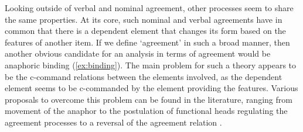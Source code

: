 \documentclass[output=paper
,modfonts
,nonflat]{langsci/langscibook}
\begin{document}
Looking outside of verbal and nominal agreement, other processes seem to share the same properties.
At its core, such nominal and verbal agreements have in common that there is a dependent element that changes its form based on the features of another item.
If we define `agreement' in such a broad manner, then another obvious candidate for an analysis in terms of agreement would be anaphoric binding (\ref{ex:binding}). The main problem for such a theory appears to be the c-command relations between the elements involved, as the dependent element seems to be c-commanded by the element providing the features. Various proposals to overcome this problem can be found in the literature, ranging from movement of the anaphor \citep{rooryckvandenwyngaerd} to the postulation of functional heads regulating the agreement processes \citep{reuland2001,reuland2011} to a reversal of the agreement relation \citep{bjorkmanzeijlstra}.
\end{document}
